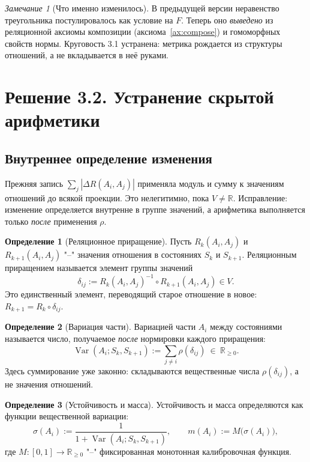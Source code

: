 \documentclass[12pt,a4paper]{article}
\theoremstyle{definition}
\newtheorem{definition}{Определение}[section]
\theoremstyle{plain}
\theoremstyle{remark}
\newtheorem{remark}{Замечание}[section]
\newcommand{\Rel}{R}
\newcommand{\Values}{V}
\newcommand{\State}{S}
\newcommand{\comp}{\circ}
\newcommand{\norm}{\rho}
\newcommand{\Varr}{\operatorname{Var}}
\newcommand{\Stab}{\sigma}
\begin{document}
\begin{remark}[Что именно изменилось]
В предыдущей версии неравенство треугольника постулировалось как условие на $F$.
Теперь оно \emph{выведено} из реляционной аксиомы композиции
(аксиома~\ref{ax:compose}) и гомоморфных свойств нормы. Круговость 3.1 устранена:
метрика рождается из структуры отношений, а не вкладывается в неё руками.
\end{remark}

\section{Решение 3.2. Устранение скрытой арифметики}

\subsection{Внутреннее определение изменения}

Прежняя запись $\sum_j|\Delta\Rel(A_i,A_j)|$ применяла модуль и сумму к значениям
отношений до всякой проекции. Это нелегитимно, пока $\Values\neq\mathbb R$. Исправление:
изменение определяется внутренне в группе значений, а арифметика выполняется только
\emph{после} применения $\norm$.

\begin{definition}[Реляционное приращение]
Пусть $\Rel_k(A_i,A_j)$ и $\Rel_{k+1}(A_i,A_j)$ "--" значения отношения в состояниях
$\State_k$ и $\State_{k+1}$. Реляционным приращением называется элемент группы значений
\[
\delta_{ij}:=\Rel_k(A_i,A_j)^{-1}\comp\Rel_{k+1}(A_i,A_j)\in\Values.
\]
Это единственный элемент, переводящий старое отношение в новое: $\Rel_{k+1}=\Rel_k\comp\delta_{ij}$.
\end{definition}

\begin{definition}[Вариация части]
Вариацией части $A_i$ между состояниями называется число, получаемое \emph{после}
нормировки каждого приращения:
\[
\Varr(A_i;\State_k,\State_{k+1}):=\sum_{j\neq i}\norm(\delta_{ij})\ \in\ \mathbb R_{\ge0}.
\]
Здесь суммирование уже законно: складываются вещественные числа $\norm(\delta_{ij})$,
а не значения отношений.
\end{definition}

\begin{definition}[Устойчивость и масса]
Устойчивость и масса определяются как функции вещественной вариации:
\[
\Stab(A_i):=\frac{1}{1+\Varr(A_i;\State_k,\State_{k+1})},
\qquad
m(A_i):=M\bigl(\Stab(A_i)\bigr),
\]
где $M:[0,1]\to\mathbb R_{\ge0}$ "--" фиксированная монотонная калибровочная функция.
\end{definition}
\end{document}
